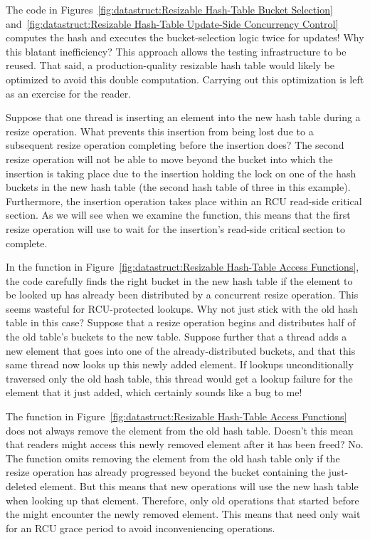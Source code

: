\begin{enumerate}
\QuickQ{}
	The code in
	Figures~\ref{fig:datastruct:Resizable Hash-Table Bucket Selection}
	and~\ref{fig:datastruct:Resizable Hash-Table Update-Side Concurrency Control}
	computes the hash and executes the bucket-selection logic twice for
	updates!
	Why this blatant inefficiency?
\QuickA{}
	This approach allows the  testing infrastructure
	to be reused.
	That said, a production-quality resizable hash table would likely
	be optimized to avoid this double computation.
	Carrying out this optimization is left as an exercise for the reader.

\QuickQ{}
	Suppose that one thread is inserting an element into the
	new hash table during a resize operation.
	What prevents this insertion from being lost due to a subsequent
	resize operation completing before the insertion does?
\QuickA{}
	The second resize operation will not be able to move beyond
	the bucket into which the insertion is taking place due to
	the insertion holding the lock on one of the hash buckets in
	the new hash table (the second hash table of three in this
	example).
	Furthermore, the insertion operation takes place within an
	RCU read-side critical section.
	As we will see when we examine the 
	function, this means that the first resize operation will
	use
	 to wait for the insertion's read-side
	critical section to complete.

\QuickQ{}
	In the  function in
	Figure~\ref{fig:datastruct:Resizable Hash-Table Access Functions},
	the code carefully finds the right bucket in the new hash table
	if the element to be looked up has already been distributed
	by a concurrent resize operation.
	This seems wasteful for RCU-protected lookups.
	Why not just stick with the old hash table in this case?
\QuickA{}
	Suppose that a resize operation begins and distributes half of
	the old table's buckets to the new table.
	Suppose further that a thread adds a new element that goes into
	one of the already-distributed buckets, and that this same thread
	now looks up this newly added element.
	If lookups unconditionally traversed only the old hash table,
	this thread would get a lookup failure for the element that it
	just added, which certainly sounds like a bug to me!

\QuickQ{}
	The  function in
	Figure~\ref{fig:datastruct:Resizable Hash-Table Access Functions}
	does not always remove the element from the old hash table.
	Doesn't this mean that readers might access this newly removed
	element after it has been freed?
\QuickA{}
	No.
	The  function omits removing the element
	from the old hash table only if the resize operation has
	already progressed beyond the bucket containing the just-deleted
	element.
	But this means that new  operations will
	use the new hash table when looking up that element.
	Therefore, only old  operations that started
	before the  might encounter the newly
	removed element.
	This means that  need only wait for an
	RCU grace period to avoid inconveniencing
	 operations.


\end{enumerate}
